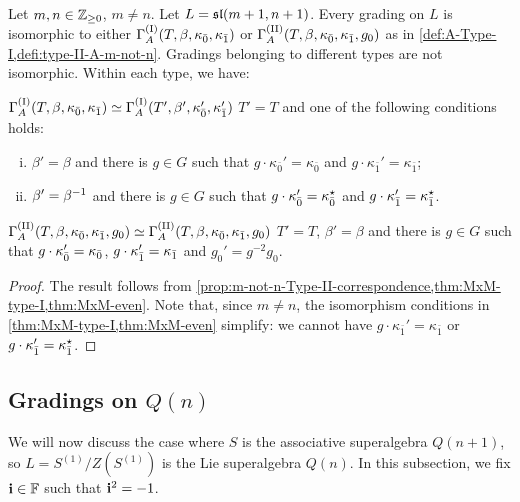 \begin{thm}\label{thm:final-m-not-n}
    Let $m,n \in \mathbb{Z}_{\geq 0}$, $m \neq n$. 
    Let $L = \mathfrak{sl}(m+1, n+1)$. 
    Every grading on $L$ is isomorphic to either $\Gamma_A^{\mathrm{(I)}}(T, \beta, \kappa_{\bar{0}}, \kappa_{\bar{1}})$ or $\Gamma_A^{\mathrm{(II)}}(T,\beta, \kappa_{\bar{0}}, \kappa_{\bar{1}}, g_0)$ as in \cref{def:A-Type-I,defi:type-II-A-m-not-n}. 
    Gradings belonging to different types are not isomorphic. 
    Within each type, we have:
    
    \noindent{}
    
    \noindent $\Gamma_A^{\mathrm{(I)}}(T, \beta, \kappa_{\bar{0}}, \kappa_{\bar{1}}) \simeq \Gamma_A^{\mathrm{(I)}}(T', \beta', \kappa_{\bar{0}}', \kappa_{\bar{1}}')$ \IFF  $T' = T$ and one of the following conditions holds:
	\begin{enumerate}[(i)]
	    \item $\beta'=\beta$ and there is $g\in G$ such that $g \cdot \kappa_{\bar 0}'=\kappa_{\bar 0}$ and $g \cdot \kappa_{\bar 1}'=\kappa_{\bar 1}$; 
	    \item $\beta'=\beta^{-1}$ and there is $g\in G$ such that $g \cdot \kappa_{\bar 0}'=\kappa_{\bar 0}^\star$ and $g \cdot \kappa_{\bar 1}'=\kappa_{\bar 1}^\star$.
	\end{enumerate}

    \noindent{}
    
    \noindent $\Gamma_A^{\mathrm{(II)}}(T,\beta, \kappa_{\bar{0}}, \kappa_{\bar{1}}, g_0) \simeq \Gamma_A^{\mathrm{(II)}}(T,\beta, \kappa_{\bar{0}}, \kappa_{\bar{1}}, g_0)$ \IFF
    $T' =T$, $\beta' = \beta$ and there is $g \in G$ such that $g\cdot\kappa_{\bar{0}}' = \kappa_{\bar{0}}$, $g\cdot\kappa_{\bar{1}}' = \kappa_{\bar{1}}$ and $g_0' = g^{-2}g_0$.
\end{thm}

\begin{proof}
    The result follows from \cref{prop:m-not-n-Type-II-correspondence,thm:MxM-type-I,thm:MxM-even}. 
    Note that, since $m \neq n$, the isomorphism conditions in \cref{thm:MxM-type-I,thm:MxM-even} simplify: we cannot have $g \cdot \kappa_{\bar 1}'=\kappa_{\bar 1}$ or $g \cdot \kappa_{\bar 1}'=\kappa_{\bar 1}^\star$. 
\end{proof}


\subsection{Gradings on \texorpdfstring{$Q(n)$}{Q(n)}}
We will now discuss the case where $S$ is the associative superalgebra $Q(n+1)$, so $L = S^{(1)}/Z(S^{(1)})$ is the Lie superalgebra $Q(n)$. 
In this subsection, we fix $\mathbf{i} \in \mathbb{F}$ such that $\mathbf{i}^2 = -1$. 

